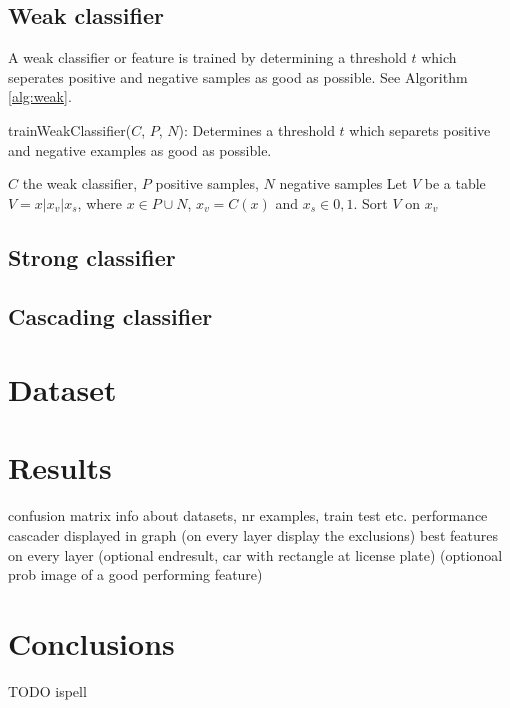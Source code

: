 \documentclass[a4paper,11pt]{article}
\begin{document}
\subsection*{Weak classifier}
A weak classifier or feature is trained by determining a threshold $t$ which
seperates positive and negative samples as good as possible. See Algorithm
\ref{alg:weak}.
\begin{algorithm}
	\caption{trainWeakClassifier($C$, $P$, $N$): Determines a threshold $t$ which
	separets positive and negative examples as good as possible.}
	\begin{algorithmic}[1]
	\REQUIRE $C$ the weak classifier, $P$ positive samples, $N$ negative samples
	\medskip
	\STATE Let $V$ be a table $V = x|x_v|x_s$, where $x \in P \cup N$, $x_v = C(x)$ and $x_s \in {0,1}$.
	\STATE Sort $V$ on $x_v$
		\STATE 
	\ENDFOR
	
	\end{algorithmic}
\label{alg:weak}
\end{algorithm}
\subsection*{Strong classifier}
\subsection*{Cascading classifier}


\section*{Dataset}
\section*{Results}
confusion matrix
info about datasets, nr examples, train test etc.
performance cascader displayed in graph (on every layer display the exclusions)
best features on every layer
(optional endresult, car with rectangle at license plate)
(optionoal prob image of a good performing feature)


\section*{Conclusions}
TODO ispell

\renewcommand\bibname{References}


\end{document}
